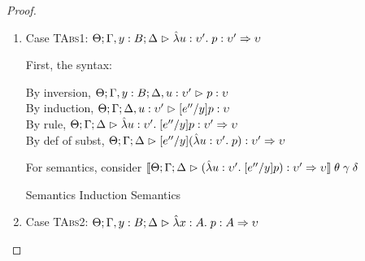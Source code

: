 \begin{proof}
\begin{enumerate}
  Next, consider $\interp{\judgeA[\Theta; \Delta; \Gamma]{u}{A}}\;\theta\;\gamma\;\delta$\\
  \begin{eqnproof}
          {Semantics}
  \end{eqnproof}

\item Case \textsc{TAbs1}: $\judgeA[\Theta; \Gamma, y:B; \Delta]{\pfun{u}{\upsilon'}{p}}{\upsilon' \To \upsilon}$
  
  First, the syntax:
  \begin{tabbedproof}
    \oo By inversion, $\judgeA[\Theta; \Gamma, y:B; \Delta, u:\upsilon']{p}{\upsilon}$ \\
    \oo By induction, $\judgeA[\Theta; \Gamma; \Delta, u:\upsilon']{[e''/y]p}{\upsilon}$ \\
    \oo By rule, $\judgeA[\Theta; \Gamma; \Delta]{\pfun{u}{\upsilon'}{[e''/y]p}}{\upsilon' \To \upsilon}$ \\
    \oo By def of subst, $\judgeA[\Theta; \Gamma; \Delta]{[e''/y](\pfun{u}{\upsilon'}{p})}{\upsilon' \To \upsilon}$ \\
  \end{tabbedproof}
  For semantics, consider $\interp{\judgeA[\Theta; \Gamma; \Delta]{(\pfun{u}{\upsilon'}{[e''/y]p})}{\upsilon' \To \upsilon}}\;\theta\;\gamma\;\delta$ \\
  \begin{eqnproof}
          {Semantics}
          {Induction}
          {Semantics}
  \end{eqnproof}

\item Case \textsc{TAbs2}: $\judgeA[\Theta; \Gamma, y:B; \Delta]{\pfun{x}{A}{p}}{A \To \upsilon}$
  

\end{enumerate}
\end{proof}
